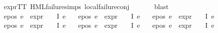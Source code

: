 \begin{isabellebody}
\ expr{\isacharunderscore}{\kern0pt}TT\ HML{\isacharunderscore}{\kern0pt}failure{\isachardot}{\kern0pt}simps\ local{\isachardot}{\kern0pt}failure{\isacharunderscore}{\kern0pt}conj\ \isanewline
\ \ \ \ \isamarkupfalse%
\ blast\isanewline
\ \ \isamarkupfalse%
\ e{}{\isacharunderscore}{\kern0pt}pos{\isacharcolon}{\kern0pt}\ {\isachardoublequoteopen}{\isasymforall}e\ {\isasymin}\ {\isacharparenleft}{\kern0pt}expr{\isacharunderscore}{\kern0pt}{}\ {\isasymcirc}\ {\isasymPhi}{\isacharparenright}{\kern0pt}\ {\isacharbackquote}{\kern0pt}\ I{\isachardot}{\kern0pt}\ e\ {\isacharequal}{\kern0pt}\ {}{\isachardoublequoteclose}\isanewline
{}\ e{}{\isacharunderscore}{\kern0pt}pos{\isacharcolon}{\kern0pt}\ {\isachardoublequoteopen}{\isasymforall}e\ {\isasymin}\ {\isacharparenleft}{\kern0pt}expr{\isacharunderscore}{\kern0pt}{}\ {\isasymcirc}\ {\isasymPhi}{\isacharparenright}{\kern0pt}\ {\isacharbackquote}{\kern0pt}\ I{\isachardot}{\kern0pt}\ e\ {\isacharequal}{\kern0pt}\ {}{\isachardoublequoteclose}\isanewline
{}\ e{}{\isacharunderscore}{\kern0pt}pos{\isacharcolon}{\kern0pt}\ {\isachardoublequoteopen}{\isasymforall}e\ {\isasymin}\ {\isacharparenleft}{\kern0pt}expr{\isacharunderscore}{\kern0pt}{}\ {\isasymcirc}\ {\isasymPhi}{\isacharparenright}{\kern0pt}\ {\isacharbackquote}{\kern0pt}\ I{\isachardot}{\kern0pt}\ e\ {\isacharequal}{\kern0pt}\ {}{\isachardoublequoteclose}\isanewline
{}\ e{}{\isacharunderscore}{\kern0pt}pos{\isacharcolon}{\kern0pt}\ {\isachardoublequoteopen}{\isasymforall}e\ {\isasymin}\ {\isacharparenleft}{\kern0pt}expr{\isacharunderscore}{\kern0pt}{}\ {\isasymcirc}\ {\isasymPhi}{\isacharparenright}{\kern0pt}\ {\isacharbackquote}{\kern0pt}\ I{\isachardot}{\kern0pt}\ e\ {\isacharequal}{\kern0pt}\ {}{\isachardoublequoteclose}\isanewline
{}\ e{}{\isacharunderscore}{\kern0pt}pos{\isacharcolon}{\kern0pt}\ {\isachardoublequoteopen}{\isasymforall}e\ {\isasymin}\ {\isacharparenleft}{\kern0pt}expr{\isacharunderscore}{\kern0pt}{}\ {\isasymcirc}\ {\isasymPhi}{\isacharparenright}{\kern0pt}\ {\isacharbackquote}{\kern0pt}\ I{\isachardot}{\kern0pt}\ e\ {\isacharequal}{\kern0pt}\ {}{\isachardoublequoteclose}\isanewline
{}\ e{}{\isacharunderscore}{\kern0pt}pos{\isacharcolon}{\kern0pt}\ {\isachardoublequoteopen}{\isasymforall}e\ {\isasymin}\ {\isacharparenleft}{\kern0pt}expr{\isacharunderscore}{\kern0pt}{}\ {\isasymcirc}\ {\isasymPhi}{\isacharparenright}{\kern0pt}\ {\isacharbackquote}{\kern0pt}\ I{\isachardot}{\kern0pt}\ e\ {\isacharequal}{\kern0pt}\ {}{\isachardoublequoteclose}\isanewline

\end{isabellebody}
